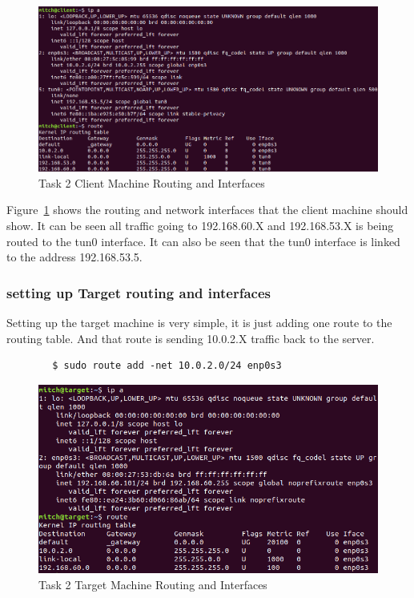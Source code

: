 \documentclass[12pt]{article}
\begin{document}
    \begin{figure}[H]
        \begin{center}
            \includegraphics[scale=0.45]{t2_client_routing.png}
        \end{center}{}
        \caption{Task 2 Client Machine Routing and Interfaces}
        \label{fig:t2_client_routing}
    \end{figure}
    
    Figure~\ref{fig:t2_client_routing} shows the routing and network interfaces that the client machine should show. It can be seen all traffic going to 192.168.60.X and 192.168.53.X is being routed to the tun0 interface. It can also be seen that the tun0 interface is linked to the address 192.168.53.5.
    
    
\subsubsection{setting up Target routing and interfaces}
    Setting up the target machine is very simple, it is just adding one route to the routing table. And that route is sending 10.0.2.X traffic back to the server.
    \begin{verbatim}
        $ sudo route add -net 10.0.2.0/24 enp0s3    
    \end{verbatim}

    \begin{figure}[H]
        \begin{center}
            \includegraphics[scale=0.45]{t2_target_routing.png}
        \end{center}{}
        \caption{Task 2 Target Machine Routing and Interfaces}
        \label{fig:t2_target_routing}
    \end{figure}
    
\end{document}
